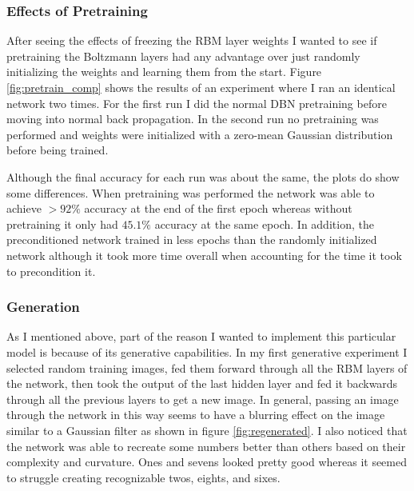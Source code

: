 \documentclass{article}
\begin{document}
	\subsubsection{Effects of Pretraining}
	After seeing the effects of freezing the RBM layer weights I wanted to see if pretraining the Boltzmann layers had any advantage over just randomly initializing the weights and learning them from the start.
	Figure \ref{fig:pretrain_comp} shows the results of an experiment where I ran an identical network two times. For the first run I did the normal DBN pretraining before moving into normal back propagation. In the second run no pretraining was performed and weights were initialized with a zero-mean Gaussian distribution before being trained. 	
	
	Although the final accuracy for each run was about the same, the plots do show some differences. When pretraining was performed the network was able to achieve $>92\%$ accuracy at the end of the first epoch whereas without pretraining it only had $45.1\%$ accuracy at the same epoch. In addition, the preconditioned network trained in less epochs than the randomly initialized network although it took more time overall when accounting for the time it took to precondition it.
	
	
	 
	\subsubsection{Generation}
	As I mentioned above, part of the reason I wanted to implement this particular model is because of its generative capabilities. In my first generative experiment I selected random training images, fed them forward through all the RBM layers of the network, then took the output of the last hidden layer and fed it backwards through all the previous layers to get a new image. In general, passing an image through the network in this way seems to have a blurring effect on the image similar to a Gaussian filter as shown in figure \ref{fig:regenerated}. I also noticed that the network was able to recreate some numbers better than others based on their complexity and curvature. Ones and sevens looked pretty good whereas it seemed to struggle creating recognizable twos, eights, and sixes.    
	
\end{document}
